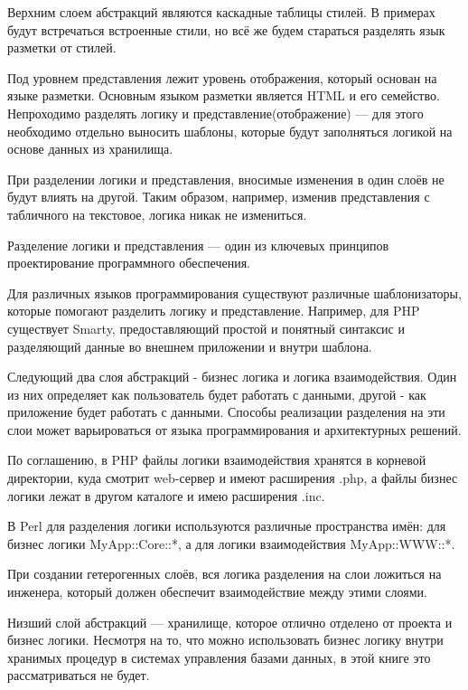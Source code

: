 Верхним слоем абстракций являются каскадные таблицы стилей. В примерах будут встречаться встроенные стили, но всё же будем стараться разделять язык разметки от стилей.

Под уровнем представления лежит уровень отображения, который основан на языке разметки. Основным языком разметки является HTML и его семейство. Непроходимо разделять логику и представление(отображение) --- для этого необходимо отдельно выносить шаблоны, которые будут заполняться логикой на основе данных из хранилища. 


При разделении логики и представления, вносимые изменения в один слоёв не будут влиять на другой. Таким образом, например, изменив представления с табличного на текстовое, логика никак не измениться.

Разделение логики и представления --- один из ключевых принципов проектирование программного обеспечения.

Для различных языков программирования существуют различные шаблонизаторы, которые помогают разделить логику и представление. Например, для PHP существует Smarty, предоставляющий простой и понятный синтаксис и разделяющий данные во внешнем приложении и внутри шаблона.

Следующий два слоя абстракций - бизнес логика и логика взаимодействия. Один из них определяет как пользователь будет работать с данными, другой - как приложение будет работать с данными. Способы реализации разделения на эти слои может варьироваться от языка программирования и архитектурных решений.

По соглашению, в PHP файлы логики взаимодействия хранятся в корневой директории, куда смотрит web-сервер и имеют расширения .php, а файлы бизнес логики лежат в другом каталоге и имею расширения .inc.

В Perl для разделения логики используются различные пространства имён: для бизнес логики MyApp::Core::*, а для логики взаимодействия MyApp::WWW::*.


При создании гетерогенных слоёв, вся логика разделения на слои ложиться на инженера, который должен обеспечит взаимодействие между этими слоями.

Низший слой абстракций --- хранилище, которое отлично отделено от проекта и бизнес логики. Несмотря на то, что можно использовать бизнес логику внутри хранимых процедур в системах управления базами данных, в этой книге это рассматриваться не будет.

